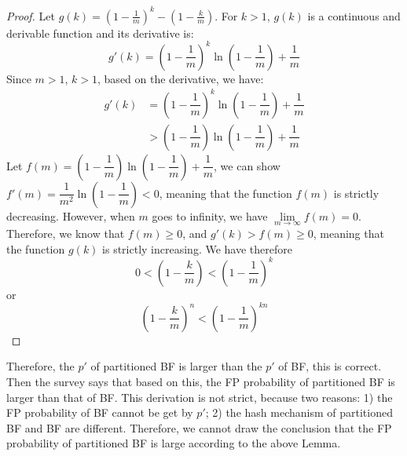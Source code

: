 \begin{proof}
Let $g(k)=( 1-\frac{1}{m} )  ^k- ( 1-\frac{k}{m} )$. For $k>1$, $g(k)$ is a continuous and derivable function and its derivative is:
\begin{equation}
g'(k)=\left( 1- \dfrac{1}{m}\right)^k \ln\left(1-\dfrac{1}{m}\right)+\dfrac{1}{m}
\end{equation}
Since $m > 1$, $k > 1$, based on the derivative, we have:
\begin{equation}
\begin{aligned}
g'(k) &=\left( 1- \dfrac{1}{m}\right)^k \ln\left(1-\dfrac{1}{m}\right)+\dfrac{1}{m} \\
&> \left( 1- \dfrac{1}{m}\right)\ln\left(1-\dfrac{1}{m}\right)+\dfrac{1}{m}
\end{aligned}
\end{equation}
Let $f(m)=\left( 1- \dfrac{1}{m}\right)\ln\left(1-\dfrac{1}{m}\right)+\dfrac{1}{m}$, we can show $f'(m) = \dfrac{1}{m^2} \ln\left(1-\dfrac{1}{m}\right)< 0$, meaning that the function $f(m)$ is strictly decreasing. However, when $m$ goes to infinity, we have $\lim\limits_{m \to \infty}  f(m) =  0$. Therefore, we know that $f(m) \geq 0$, and $g'(k) > f(m) \geq 0$, meaning that the function $g(k)$ is strictly increasing.
We have therefore 
\begin{equation}
0<\left( 1-\dfrac{k}{m} \right)   <
\left( 1-\dfrac{1}{m} \right)  ^k
\end{equation}
or 
\begin{equation}
\left( 1-\dfrac{k}{m} \right) ^n   <
\left( 1-\dfrac{1}{m} \right)  ^{kn}
\end{equation}
\end{proof}

Therefore, the $p'$ of partitioned BF is larger than the $p'$ of BF, this is correct.
Then the survey says that based on this, the FP probability of partitioned BF is larger than that of BF.
This derivation is not strict, because two reasons: 1) the FP probability of BF cannot be get by $p'$; 2) the hash mechanism of partitioned BF and BF are different. 
Therefore, we cannot draw the conclusion that the FP probability of partitioned BF is large according to the above Lemma.


